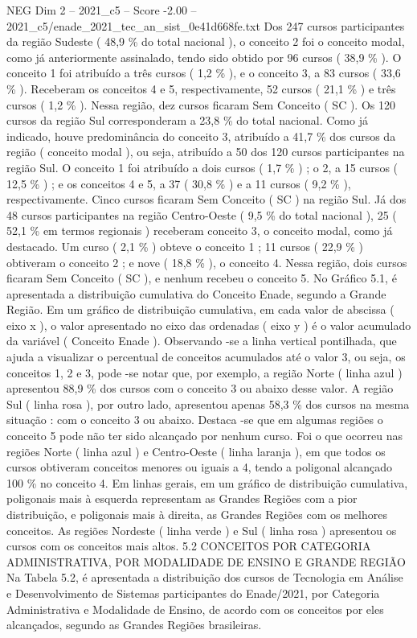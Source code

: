 \begin{textsample}{NEG Dim 2 – 2021\_c5 – Score -2.00 – 2021\_c5/enade\_2021\_tec\_an\_sist\_0e41d668fe.txt}
Dos 247 cursos participantes da região Sudeste ( 48,9 \% do total nacional ), o conceito 2 foi o conceito modal, como já anteriormente assinalado, tendo sido obtido por 96 cursos ( 38,9 \% ).
O conceito 1 foi atribuído a três cursos ( 1,2 \% ), e o conceito 3, a 83 cursos ( 33,6 \% ).
Receberam os conceitos 4 e 5, respectivamente, 52 cursos ( 21,1 \% ) e três cursos ( 1,2 \% ).
Nessa região, dez cursos ficaram Sem Conceito ( SC ).
Os 120 cursos da região Sul corresponderam a 23,8 \% do total nacional.
Como já indicado, houve predominância do conceito 3, atribuído a 41,7 \% dos cursos da região ( conceito modal ), ou seja, atribuído a 50 dos 120 cursos participantes na região Sul.
O conceito 1 foi atribuído a dois cursos ( 1,7 \% ) ; o 2, a 15 cursos ( 12,5 \% ) ; e os conceitos 4 e 5, a 37 ( 30,8 \% ) e a 11 cursos ( 9,2 \% ), respectivamente.
Cinco cursos ficaram Sem Conceito ( SC ) na região Sul.
Já dos 48 cursos participantes na região Centro-Oeste ( 9,5 \% do total nacional ), 25 ( 52,1 \% em termos regionais ) receberam conceito 3, o conceito modal, como já destacado.
Um curso ( 2,1 \% ) obteve o conceito 1 ; 11 cursos ( 22,9 \% ) obtiveram o conceito 2 ; e nove ( 18,8 \% ), o conceito 4.
Nessa região, dois cursos ficaram Sem Conceito ( SC ), e nenhum recebeu o conceito 5.
No Gráfico 5.1, é apresentada a distribuição cumulativa do Conceito Enade, segundo a Grande Região.
Em um gráfico de distribuição cumulativa, em cada valor de abscissa ( eixo x ), o valor apresentado no eixo das ordenadas ( eixo y ) é o valor acumulado da variável ( Conceito Enade ).
Observando -se a linha vertical pontilhada, que ajuda a visualizar o percentual de conceitos acumulados até o valor 3, ou seja, os conceitos 1, 2 e 3, pode -se notar que, por exemplo, a região Norte ( linha azul ) apresentou 88,9 \% dos cursos com o conceito 3 ou abaixo desse valor.
A região Sul ( linha rosa ), por outro lado, apresentou apenas 58,3 \% dos cursos na mesma situação : com o conceito 3 ou abaixo.
Destaca -se que em algumas regiões o conceito 5 pode não ter sido alcançado por nenhum curso.
Foi o que ocorreu nas regiões Norte ( linha azul ) e Centro-Oeste ( linha laranja ), em que todos os cursos obtiveram conceitos menores ou iguais a 4, tendo a poligonal alcançado 100 \% no conceito 4.
Em linhas gerais, em um gráfico de distribuição cumulativa, poligonais mais à esquerda representam as Grandes Regiões com a pior distribuição, e poligonais mais à direita, as Grandes Regiões com os melhores conceitos.
As regiões Nordeste ( linha verde ) e Sul ( linha rosa ) apresentou os cursos com os conceitos mais altos. 5.2 CONCEITOS POR CATEGORIA ADMINISTRATIVA, POR MODALIDADE DE ENSINO E GRANDE REGIÃO Na Tabela 5.2, é apresentada a distribuição dos cursos de Tecnologia em Análise e Desenvolvimento de Sistemas participantes do Enade/2021, por Categoria Administrativa e Modalidade de Ensino, de acordo com os conceitos por eles alcançados, segundo as Grandes Regiões brasileiras.

\end{textsample}

